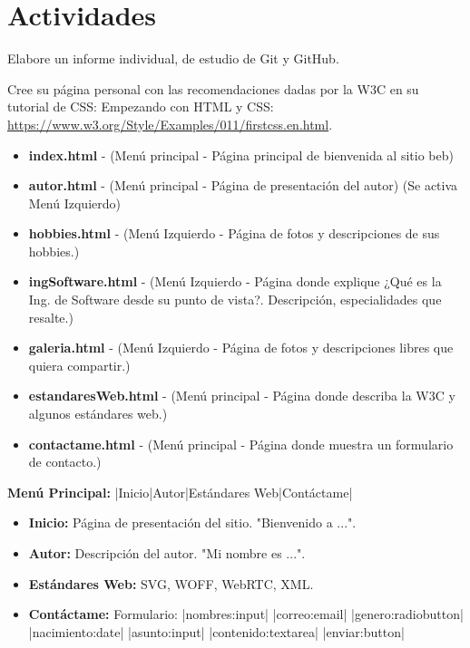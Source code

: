 \section{Actividades}
Elabore un informe individual, de estudio de Git y GitHub.

Cree su página personal con las recomendaciones dadas por la W3C en su tutorial de CSS: Empezando con HTML y CSS: \url{https://www.w3.org/Style/Examples/011/firstcss.en.html}.

\begin{itemize}
    \item \textbf{index.html} - (Menú principal - Página principal de bienvenida al sitio beb)
    
    \item \textbf{autor.html} - (Menú principal - Página de presentación del autor) (Se activa Menú Izquierdo)
    
    \item \textbf{hobbies.html} - (Menú Izquierdo - Página de fotos y descripciones de sus hobbies.)
    
    \item \textbf{ingSoftware.html} - (Menú Izquierdo - Página donde explique ¿Qué es la Ing. de Software desde su punto de vista?. Descripción, especialidades que resalte.)
    
    \item \textbf{galeria.html} - (Menú Izquierdo - Página de fotos y descripciones libres que quiera compartir.)
    
    \item \textbf{estandaresWeb.html} - (Menú principal - Página donde describa la W3C y algunos estándares web.)
    
    \item \textbf{contactame.html} - (Menú principal - Página donde muestra un formulario de contacto.)
\end{itemize}

\textbf{Menú Principal:} |Inicio|Autor|Estándares Web|Contáctame|

\begin{itemize}
    \item \textbf{Inicio:} Página de presentación del sitio. "Bienvenido a ...".
    
    \item \textbf{Autor:} Descripción del autor. "Mi nombre es ...".
    
    \item \textbf{Estándares Web:} SVG, WOFF, WebRTC, XML.
    
    \item \textbf{Contáctame:} Formulario: |nombres:input| |correo:email| |genero:radiobutton| |nacimiento:date| |asunto:input| |contenido:textarea| |enviar:button|
\end{itemize}


